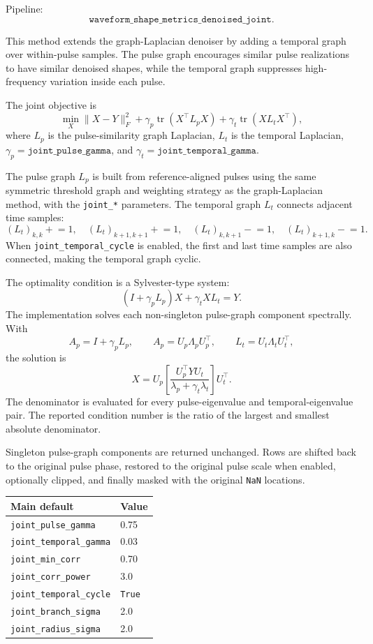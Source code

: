 \documentclass[11pt]{article}
\begin{document}
Pipeline:
\[
    \texttt{waveform\_shape\_metrics\_denoised\_joint}.
\]

This method extends the graph-Laplacian denoiser by adding a temporal graph
over within-pulse samples.  The pulse graph encourages similar pulse
realizations to have similar denoised shapes, while the temporal graph
suppresses high-frequency variation inside each pulse.

The joint objective is
\[
    \min_X
    \|X-Y\|_F^2
    +\gamma_p\operatorname{tr}(X^\top L_p X)
    +\gamma_t\operatorname{tr}(X L_t X^\top),
\]
where \(L_p\) is the pulse-similarity graph Laplacian,
\(L_t\) is the temporal Laplacian,
\(\gamma_p=\texttt{joint\_pulse\_gamma}\), and
\(\gamma_t=\texttt{joint\_temporal\_gamma}\).

The pulse graph \(L_p\) is built from reference-aligned pulses using the same
symmetric threshold graph and weighting strategy as the graph-Laplacian method,
with the \texttt{joint\_*} parameters.  The temporal graph \(L_t\) connects
adjacent time samples:
\[
    (L_t)_{k,k}\mathrel{+}=1,\quad
    (L_t)_{k+1,k+1}\mathrel{+}=1,\quad
    (L_t)_{k,k+1}\mathrel{-}=1,\quad
    (L_t)_{k+1,k}\mathrel{-}=1.
\]
When \texttt{joint\_temporal\_cycle} is enabled, the first and last time
samples are also connected, making the temporal graph cyclic.

The optimality condition is a Sylvester-type system:
\[
    (I+\gamma_p L_p)X+\gamma_t X L_t=Y.
\]
The implementation solves each non-singleton pulse-graph component spectrally.
With
\[
    A_p=I+\gamma_p L_p,
    \qquad
    A_p=U_p\Lambda_pU_p^\top,
    \qquad
    L_t=U_t\Lambda_tU_t^\top,
\]
the solution is
\[
    X =
    U_p
    \left[
        \frac{U_p^\top Y U_t}
             {\lambda_p+\gamma_t\lambda_t}
    \right]
    U_t^\top.
\]
The denominator is evaluated for every pulse-eigenvalue and temporal-eigenvalue
pair.  The reported condition number is the ratio of the largest and smallest
absolute denominator.

Singleton pulse-graph components are returned unchanged.  Rows are shifted
back to the original pulse phase, restored to the original pulse scale when
enabled, optionally clipped, and finally masked with the original \texttt{NaN}
locations.

\begin{tabular}{@{}ll@{}}
\toprule
Main default & Value \\
\midrule
\texttt{joint\_pulse\_gamma} & 0.75 \\
\texttt{joint\_temporal\_gamma} & 0.03 \\
\texttt{joint\_min\_corr} & 0.70 \\
\texttt{joint\_corr\_power} & 3.0 \\
\texttt{joint\_temporal\_cycle} & \texttt{True} \\
\texttt{joint\_branch\_sigma} & 2.0 \\
\texttt{joint\_radius\_sigma} & 2.0 \\
\bottomrule
\end{tabular}
\end{document}
